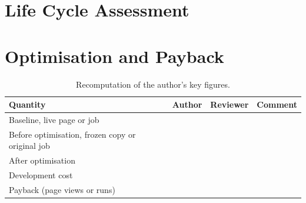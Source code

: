 \documentclass[conference,a4paper]{IEEEtran}
\newif\ifguidance
\newcommand{\guidance}[1]{\ifguidance{\itshape\small #1\par\medskip}\fi}
\begin{document}
\section{Life Cycle Assessment}
\guidance{Judge each subsection of III on whether it does its job. Then
recompute the baseline from what the paper gives you, and put your figure in
Table~\ref{tab:recomputation}. Section~III.B declares what makes the paper's
numbers reproducible: for a web page, whether it arrives compressed and on what
date that was read, so recompute the bytes on that basis; for an HPC job, the
commit, the fixed input and the exclusive node it ran on. If you cannot recompute it, say
precisely what is missing.}

\section{Optimisation and Payback}
\guidance{Run the script from the archive distributed with the paper and report
what happened. Keep a scientific finding apart from an environment problem.

Recompute the remaining figures of Table~\ref{tab:recomputation}. A before and
an after are comparable when they are produced the same way: for a web page,
the same server started with the same compression setting; for an HPC job, the
same partition and node type with the same fixed input. Check that Section~IV
says which. Then judge whether the optimisation and the payback follow from
what Section~III found.}

\begin{table}[htbp]
\centering
\caption{Recomputation of the author's key figures.}
\label{tab:recomputation}
\begin{tabular}{|>{\raggedright\arraybackslash}p{2.3cm}|r|r|>{\raggedright\arraybackslash}p{2.0cm}|}
\hline
\textbf{Quantity} & \textbf{Author} & \textbf{Reviewer} & \textbf{Comment} \\
\hline
Baseline, live page or job &  &  &  \\
\hline
Before optimisation, frozen copy or original job &  &  &  \\
\hline
After optimisation       &  &  &  \\
\hline
Development cost         &  &  &  \\
\hline
Payback (page views or runs) &  &  &  \\
\hline
\end{tabular}
\end{table}
\end{document}

